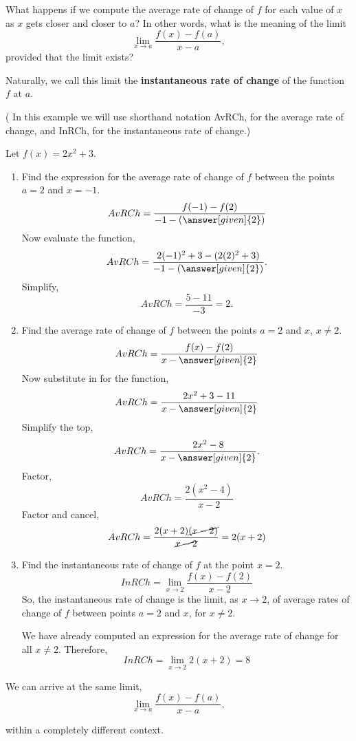 \documentclass{ximera}
\begin{document}
What happens if we compute the average rate of change of $f$  for each value of $x$ as $x$ gets closer and closer to $a$? In other words, what is the meaning of the limit
\[
     \lim_{x\to a} \frac{f(x)-f(a)}{x-a},
    \] 
    provided that the limit exists?
    
Naturally, we call this limit the \textbf{instantaneous rate of change} of the function $f$ at $a$.
\begin{example}
( In this example we will use shorthand notation AvRCh, for the average rate of change,  and InRCh, for the instantaneous rate of change.)

Let $f(x)=2x^2+3$.
\begin{enumerate}
\item Find the expression for the average rate of change of $f$ between the points  $a=2$ and $x=-1$.
\[
AvRCh=\frac{f(-1)-f(2)}{-1-(\answer[given]{2})}
\]
  Now evaluate the function,
  \[
AvRCh=\frac{2(-1)^2+3-(2(2)^2+3)}{-1-(\answer[given]{2})}.
\]
Simplify,
 \[
AvRCh=\frac{5-11}{-3}=2.
\]
\item Find  the average rate of change of $f$ between the points $a=2$ and $x$, $x\ne 2$.
\[
AvRCh=\frac{f(x)-f(2)}{x-\answer[given]{2}}
\]
 Now substitute in for the function,
\[
AvRCh=\frac{2x^2+3-11}{x-\answer[given]{2}}
\]
Simplify the top,
\[
AvRCh=\frac{2x^2-8}{x-\answer[given]{2}}.
\]
Factor,
\[
AvRCh=\frac{2(x^2-4)}{x-2}
\]
Factor and cancel,
\[
AvRCh=\frac{2(x+2)\cancel{(x-2)}}{\cancel{x-2}}=2(x+2)
\]
\item Find the instantaneous rate of change of $f$ at the point $x=2$.
\[
InRCh= \lim_{x\to 2} \frac{f(x)-f(2)}{x-2}
\]
So, the instantaneous rate of change is the limit, as $x\to 2$, of average rates of change of $f$ between points $a=2$ and $x$, for $x\ne2$. 

We have already computed an expression for the average rate of change for all $x\ne2$. 
Therefore,
\[
InRCh=\lim_{x\to 2}2(x+2)=8
\]

\end{enumerate}
\end{example}
We can arrive at the same limit,
\[
     \lim_{x\to a} \frac{f(x)-f(a)}{x-a},
    \] 

 within a completely different context.
\end{document}
